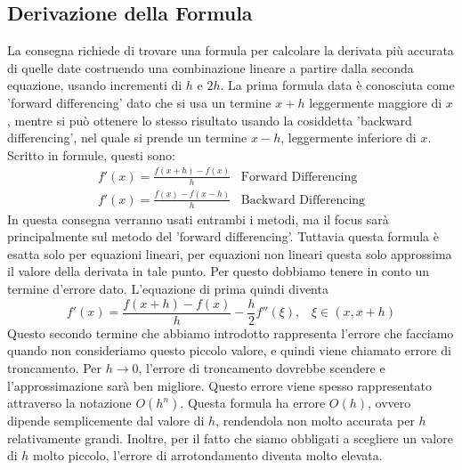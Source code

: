 \documentclass[a4paper]{article}
\begin{document}
\subsection{Derivazione della Formula}
La consegna richiede di trovare una formula per calcolare la derivata più accurata di quelle date costruendo una combinazione lineare a partire dalla seconda equazione, usando incrementi di $h$ e $2h$. La prima formula data è conosciuta come 'forward differencing' dato che si usa un termine $x+h$ leggermente maggiore di $x$, mentre si può ottenere lo stesso risultato usando la cosiddetta 'backward differencing', nel quale si prende un termine $x-h$, leggermente inferiore di $x$. Scritto in formule, questi sono:
\begin{gather*}
    f'(x) = \frac{f(x+h)-{f(x)}}{h} \; \; \; \text{Forward Differencing}\\
    f'(x) = \frac{f(x)-f(x-h)}{h}   \; \; \; \text{Backward Differencing}
\end{gather*}
In questa consegna verranno usati entrambi i metodi, ma il focus sarà principalmente sul metodo del 'forward differencing'. Tuttavia questa formula è esatta solo per equazioni lineari, per equazioni non lineari questa solo approssima il valore della derivata in tale punto. Per questo dobbiamo tenere in conto un termine d'errore dato. L'equazione di prima quindi diventa 
\begin{equation*}
    f'(x) = \frac{f(x+h)-f(x)}{h}-\frac{h}{2}f''(\xi), \; \; \; \xi \in (x,x+h)
\end{equation*}
Questo secondo termine che abbiamo introdotto rappresenta l'errore che facciamo quando non consideriamo questo piccolo valore, e quindi viene chiamato errore di troncamento. Per $h \rightarrow 0$, l'errore di troncamento dovrebbe scendere e l'approssimazione sarà ben migliore. Questo errore viene spesso rappresentato attraverso la notazione $O(h^n)$. Questa formula ha errore $O(h)$, ovvero dipende semplicemente dal valore di $h$, rendendola non molto accurata per $h$ relativamente grandi. Inoltre, per il fatto che siamo obbligati a scegliere un valore di $h$ molto piccolo, l'errore di arrotondamento diventa molto elevata.
\end{document}
